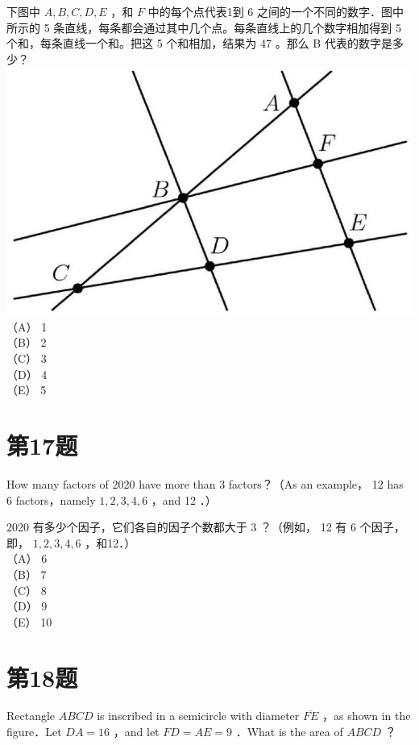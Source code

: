\documentclass[10pt]{article}
\begin{document}
下图中 $A, B, C, D, E$ ，和 $F$ 中的每个点代表1到 6 之间的一个不同的数字．图中所示的 5 条直线，每条都会通过其中几个点。每条直线上的几个数字相加得到 5 个和，每条直线一个和。把这 5 个和相加，结果为 47 。那么 B 代表的数字是多少？\\
\includegraphics[max width=\textwidth, center]{2025_09_05_48544237b06df716137eg-09}\\
（A） 1\\
（B） 2\\
（C） 3\\
（D） 4\\
（E） 5

\section*{第17题}
How many factors of 2020 have more than 3 factors？（As an example， 12 has 6 factors，namely $1,2,3,4,6$ ，and 12 ．）

2020 有多少个因子，它们各自的因子个数都大于 3 ？（例如， 12 有 6 个因子，即， $1,2,3,4,6$ ，和12．）\\
（A） 6\\
（B） 7\\
（C） 8\\
（D） 9\\
（E） 10

\section*{第18题}
Rectangle $A B C D$ is inscribed in a semicircle with diameter $\overline{F E}$ ，as shown in the figure．Let $D A=16$ ，and let $F D=A E=9$ ．What is the area of $A B C D$ ？
\end{document}
